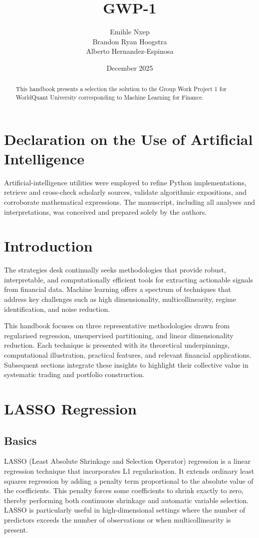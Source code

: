 \documentclass[11pt,a4paper]{article}
\title{GWP-1}
\author{Emihle Nxep\\ Brandon Ryan Hoogstra\\ Alberto Hernandez-Espinosa}
\date{December 2025}
\begin{document}
\maketitle

\begin{abstract}
This handbook presents a selection the solution to the Group Work Project 1 for WorldQuant University corresponding to Machine Learning for Finance.
\end{abstract}

\section*{Declaration on the Use of Artificial Intelligence}
Artificial-intelligence utilities were employed to refine Python implementations, retrieve and cross-check scholarly sources, validate algorithmic expositions, and corroborate mathematical expressions. The manuscript, including all analyses and interpretations, was conceived and prepared solely by the authors.

\section{Introduction}
The strategies desk continually seeks methodologies that provide robust, interpretable, and computationally efficient tools for extracting actionable signals from financial data. Machine learning offers a spectrum of techniques that address key challenges such as high dimensionality, multicollinearity, regime identification, and noise reduction.

This handbook focuses on three representative methodologies drawn from regularised regression, unsupervised partitioning, and linear dimensionality reduction. Each technique is presented with its theoretical underpinnings, computational illustration, practical features, and relevant financial applications. Subsequent sections integrate these insights to highlight their collective value in systematic trading and portfolio construction.

\section{LASSO Regression}
\subsection{Basics}
LASSO (Least Absolute Shrinkage and Selection Operator) regression is a linear regression technique that incorporates L1 regularisation. It extends ordinary least squares regression by adding a penalty term proportional to the absolute value of the coefficients. This penalty forces some coefficients to shrink exactly to zero, thereby performing both continuous shrinkage and automatic variable selection. LASSO is particularly useful in high-dimensional settings where the number of predictors exceeds the number of observations or when multicollinearity is present.
\end{document}
